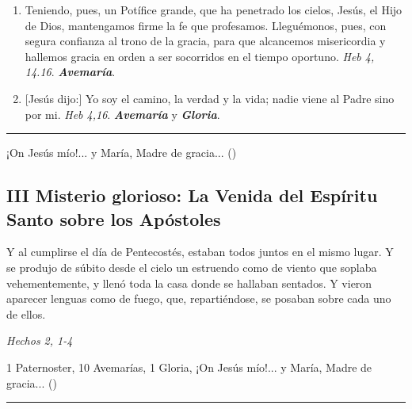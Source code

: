 \documentclass[11pt,a4paper]{book}
\begin{document}
\begin{enumerate}
        \item Teniendo, pues, un Potífice grande, que ha penetrado los cielos, Jesús, el Hijo de Dios, mantengamos firme la fe que profesamos. Lleguémonos, pues, 
            con segura confianza al trono de la gracia, para que alcancemos misericordia y hallemos gracia en orden a ser socorridos en el tiempo oportuno. 
            \emph{Heb 4, 14.16}. \textbf{\emph{Avemaría}}.

        \item {[Jesús dijo:]} Yo soy el camino, la verdad y la vida; nadie viene al Padre sino por mi. \emph{Heb 4,16}. \textbf{\emph{Avemaría}} y \textbf{\emph{Gloria}}.
    \end{enumerate}    

    \rule{\textwidth}{0.5pt}
    ¡On Jesús mío!... y María, Madre de gracia... ()

    \subsection*{III Misterio glorioso: La Venida del Espíritu Santo sobre los Apóstoles}

    Y al cumplirse el día de Pentecostés, estaban todos juntos en el mismo lugar. Y se produjo de súbito desde el cielo un estruendo como de viento que soplaba vehementemente, 
    y llenó toda la casa donde se hallaban sentados. Y vieron aparecer lenguas como de fuego, que, repartiéndose, se posaban sobre cada uno de ellos. 

    \begin{flushright}
        \emph{Hechos 2, 1-4}
    \end{flushright}    

    1 Paternoster, 10 Avemarías, 1 Gloria, ¡On Jesús mío!... y María, Madre de gracia... ()

    \rule{\textwidth}{0.5pt}
\end{document}
